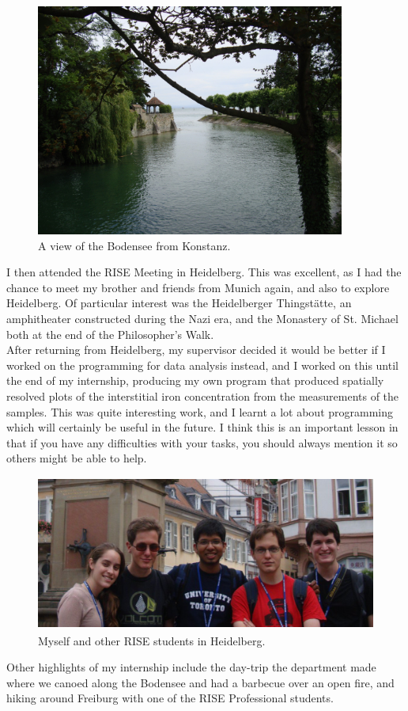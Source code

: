 \documentclass[final,a4paper,oneside,12pt]{article}
\begin{document}
\begin{center}
\begin{figure}[htp]
\centering
\includegraphics[height=3in]{bodensee}
\caption{\label{figure2} A view of the Bodensee from Konstanz.}
\end{figure}
\end{center}
I then attended the RISE Meeting in Heidelberg. This was excellent, as I had the chance to meet my brother and friends from Munich again, and also to explore Heidelberg. Of particular interest was the Heidelberger Thingstätte, an amphitheater constructed during the Nazi era, and the Monastery of St. Michael both at the end of the Philosopher's Walk.\\

After returning from Heidelberg, my supervisor decided it would be better if I worked on the programming for data analysis instead, and I worked on this until the end of my internship, producing my own program that produced spatially resolved plots of the interstitial iron concentration from the measurements of the samples. This was quite interesting work, and I learnt a lot about programming which will certainly be useful in the future. I think this is an important lesson in that if you have any difficulties with your tasks, you should always mention it so others might be able to help.\\

\begin{center}
\begin{figure}[htp]
\centering
\includegraphics[height=2in]{heidelberg}
\caption{\label{figure2} Myself and other RISE students in Heidelberg.}
\end{figure}
\end{center}
Other highlights of my internship include the day-trip the department made where we canoed along the Bodensee and had a barbecue over an open fire, and hiking around Freiburg with one of the RISE Professional students.\\
\end{document}
